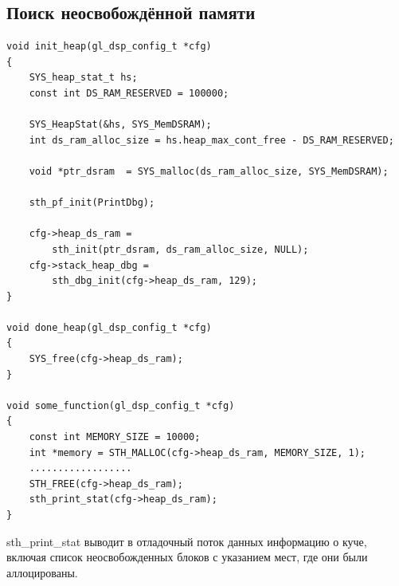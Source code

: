 \documentclass{article}
\begin{document}
\subsection{Поиск неосвобождённой памяти}
\begin{lstlisting}
void init_heap(gl_dsp_config_t *cfg)
{
    SYS_heap_stat_t hs;
    const int DS_RAM_RESERVED = 100000;

    SYS_HeapStat(&hs, SYS_MemDSRAM);
    int ds_ram_alloc_size = hs.heap_max_cont_free - DS_RAM_RESERVED;

    void *ptr_dsram  = SYS_malloc(ds_ram_alloc_size, SYS_MemDSRAM);

    sth_pf_init(PrintDbg);

    cfg->heap_ds_ram =
        sth_init(ptr_dsram, ds_ram_alloc_size, NULL);
    cfg->stack_heap_dbg =
        sth_dbg_init(cfg->heap_ds_ram, 129);
}

void done_heap(gl_dsp_config_t *cfg)
{
    SYS_free(cfg->heap_ds_ram);
}

void some_function(gl_dsp_config_t *cfg)
{
    const int MEMORY_SIZE = 10000;
    int *memory = STH_MALLOC(cfg->heap_ds_ram, MEMORY_SIZE, 1);
    ..................
    STH_FREE(cfg->heap_ds_ram);
    sth_print_stat(cfg->heap_ds_ram);
}
\end{lstlisting}
sth\_print\_stat выводит в отладочный поток данных информацию о куче, включая список неосвобожденных блоков с указанием  мест, где они были аллоцированы.

\newpage
\end{document}

